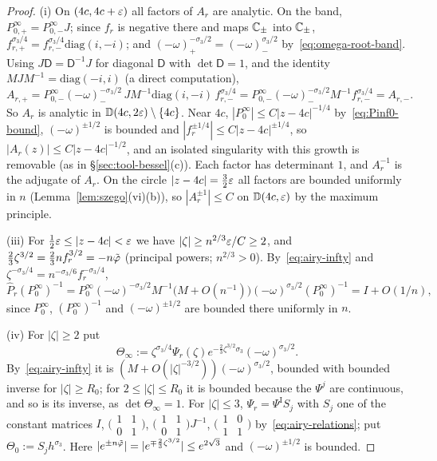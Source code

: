 \begin{proof}
(i) On $(4c,4c+\varepsilon)$ all factors of $A_r$ are analytic. On the band, $P^\infty_{0,+}=P^\infty_{0,-}J$; since $f_r$ is
negative there and maps $\mathbb{C}_\pm$ into $\mathbb{C}_\pm$, $f_{r,+}^{\sigma_3/4}=f_{r,-}^{\sigma_3/4}\mathrm{diag}(i,-i)$; and
$(-\omega)_+^{-\sigma_3/2}=(-\omega)_-^{\sigma_3/2}$ by~\eqref{eq:omega-root-band}. Using $J\mathsf D=\mathsf D^{-1}J$ for diagonal $\mathsf D$
with $\det \mathsf D=1$, and the identity $MJM^{-1}=\mathrm{diag}(-i,i)$ (a direct computation),
\[
  A_{r,+}=P^\infty_{0,-}(-\omega)_-^{-\sigma_3/2}\,JM^{-1}\mathrm{diag}(i,-i)\,f_{r,-}^{\sigma_3/4}
  =P^\infty_{0,-}(-\omega)_-^{-\sigma_3/2}M^{-1}f_{r,-}^{\sigma_3/4}=A_{r,-}.
\]
So $A_r$ is analytic in $\mathbb D(4c,2\varepsilon)\setminus\{4c\}$. Near $4c$, $|P^\infty_0|\le C|z-4c|^{-1/4}$
by~\eqref{eq:Pinf0-bound}, $(-\omega)^{\pm1/2}$ is bounded and $|f_r^{\pm1/4}|\le C|z-4c|^{\pm1/4}$, so
$|A_r(z)|\le C|z-4c|^{-1/2}$, and an isolated singularity with this growth is removable (as in
\S\ref{sec:tool-bessel}(c)). Each factor has determinant $1$, and $A_r^{-1}$ is the adjugate of $A_r$. On the circle
$|z-4c|=\frac32\varepsilon$ all factors are bounded uniformly in $n$ (Lemma~\ref{lem:szego}(vi)(b)), so $|A_r^{\pm1}|\le C$ on
$\mathbb D(4c,\varepsilon)$ by the maximum principle.

(iii) For $\frac12\varepsilon\le|z-4c|<\varepsilon$ we have $|\zeta|\ge n^{2/3}\varepsilon/C\ge2$, and
$\frac23\zeta^{3/2}=\frac23nf_r^{3/2}=-n\tilde\varphi$ (principal powers; $n^{2/3}>0$). By~\eqref{eq:airy-infty} and
$\zeta^{-\sigma_3/4}=n^{-\sigma_3/6}f_r^{-\sigma_3/4}$,
\[
  \hat P_r(P^\infty_0)^{-1}=P^\infty_0(-\omega)^{-\sigma_3/2}M^{-1}\bigl(M+O(n^{-1})\bigr)(-\omega)^{\sigma_3/2}(P^\infty_0)^{-1}=I+O(1/n),
\]
since $P^\infty_0$, $(P^\infty_0)^{-1}$ and $(-\omega)^{\pm1/2}$ are bounded there uniformly in $n$.

(iv) For $|\zeta|\ge2$ put
\[
  \Theta_\infty:=\zeta^{\sigma_3/4}\Psi_r(\zeta)e^{-\frac23\zeta^{3/2}\sigma_3}(-\omega)^{\sigma_3/2}.
\]
By~\eqref{eq:airy-infty} it is $(M+O(|\zeta|^{-3/2}))(-\omega)^{\sigma_3/2}$, bounded with bounded inverse for
$|\zeta|\ge R_0$; for $2\le|\zeta|\le R_0$ it is bounded because the $\Psi^j$ are continuous, and so is its inverse, as
$\det\Theta_\infty=1$. For $|\zeta|\le3$, $\Psi_r=\Psi^{\mathrm I}S_j$ with $S_j$ one of the constant matrices $I$,
$\bigl(\begin{smallmatrix}1&1\\0&1\end{smallmatrix}\bigr)$,
$\bigl(\begin{smallmatrix}1&1\\0&1\end{smallmatrix}\bigr)J^{-1}$,
$\bigl(\begin{smallmatrix}1&0\\1&1\end{smallmatrix}\bigr)$ by~\eqref{eq:airy-relations}; put $\Theta_0:=S_jh^{\sigma_3}$.
Here $|e^{\pm n\tilde\varphi}|=|e^{\mp\frac23\zeta^{3/2}}|\le e^{2\sqrt3}$ and $(-\omega)^{\pm1/2}$ is bounded.
\end{proof}

